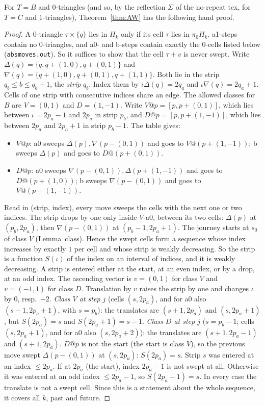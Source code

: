 \documentclass[11pt]{article}
\theoremstyle{definition}\newtheorem{definition}[theorem]{Definition}\newtheorem{remark}[theorem]{Remark}
\begin{document}
\begin{proposition}\label{prop:strip}
For $T=B$ and $0$-triangles (and so, by the reflection $\Sigma$ of the no-repeat tex, for $T=C$ and $1$-triangles), Theorem~\ref{thm:AW} has the following hand proof.
\end{proposition}
\begin{proof}
A $0$-triangle $\tau\times\{q\}$ lies in $H_k$ only if its cell $\tau$ lies in $\pi_0H_k$. a1-steps contain no $0$-triangles, and a0- and b-steps contain exactly the $0$-cells listed below (\texttt{absmoves.out}). So it suffices to show that the cell $\tau+v$ is never swept.
Write $\Delta(q)=\{q,q+(1,0),q+(0,1)\}$ and $\nabla(q)=\{q+(1,0),q+(0,1),q+(1,1)\}$. Both lie in the strip $q_b\le b\le q_b+1$, the \emph{strip} $q_b$. Index them by $\iota\Delta(q)=2q_a$ and $\iota\nabla(q)=2q_a+1$. Cells of one strip with consecutive indices share an edge.
The allowed classes for $B$ are $V=(0,1)$ and $D=(1,-1)$. Write $V@p=[p,p+(0,1)]$, which lies between $\iota=2p_a-1$ and $2p_a$ in strip $p_b$, and $D@p=[p,p+(1,-1)]$, which lies between $2p_a$ and $2p_a+1$ in strip $p_b-1$. The table gives:
\begin{itemize}
\item $V@p$: a0 sweeps $\Delta(p),\nabla(p-(0,1))$ and goes to $V@(p+(1,-1))$; b sweeps $\Delta(p)$ and goes to $D@(p+(0,1))$.
\item $D@p$: a0 sweeps $\nabla(p-(0,1)),\Delta(p+(1,-1))$ and goes to $D@(p+(1,0))$; b sweeps $\nabla(p-(0,1))$ and goes to $V@(p+(1,-1))$.
\end{itemize}
Read in (strip, index), every move sweeps the cells with the next one or two indices. The strip drops by one only inside $V$-a0, between its two cells: $\Delta(p)$ at $(p_b,2p_a)$, then $\nabla(p-(0,1))$ at $(p_b-1,2p_a+1)$.
The journey starts at $s_0$ of class $V$ (Lemma~class). Hence the swept cells form a sequence whose index increases by exactly $1$ per cell and whose strip is weakly decreasing. So the strip is a function $S(\iota)$ of the index on an interval of indices, and it is weakly decreasing. A strip is entered either at the start, at an even index, or by a drop, at an odd index.
The ascending vector is $v=(0,1)$ for class $V$ and $v=(-1,1)$ for class $D$. Translation by $v$ raises the strip by one and changes $\iota$ by $0$, resp.\ $-2$.
\emph{Class $V$ at step $j$} (cells $(s,2p_a)$, and for a0 also $(s-1,2p_a+1)$, with $s=p_b$): the translates are $(s+1,2p_a)$ and $(s,2p_a+1)$, but $S(2p_a)=s$ and $S(2p_a+1)=s-1$.
\emph{Class $D$ at step $j$} ($s=p_b-1$; cells $(s,2p_a+1)$, and for a0 also $(s,2p_a+2)$): the translates are $(s+1,2p_a-1)$ and $(s+1,2p_a)$. $D@p$ is not the start (the start is class $V$), so the previous move swept $\Delta(p-(0,1))$ at $(s,2p_a)$: $S(2p_a)=s$.
Strip $s$ was entered at an index $\le2p_a$. If at $2p_a$ (the start), index $2p_a-1$ is not swept at all. Otherwise it was entered at an odd index $\le2p_a-1$, so $S(2p_a-1)=s$.
In every case the translate is not a swept cell. Since this is a statement about the whole sequence, it covers all $k$, past and future.
\end{proof}
\end{document}

